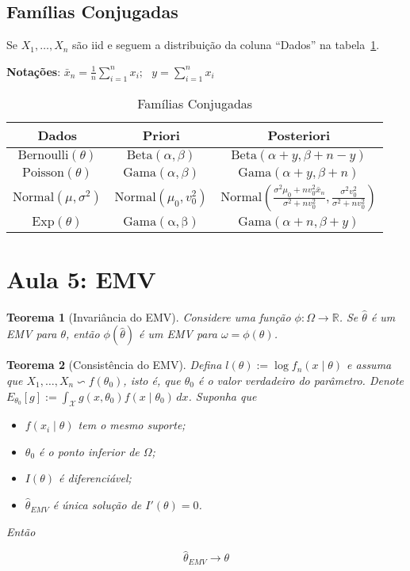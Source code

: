 \documentclass{article}
\newtheorem{theorem}{Teorema}
\begin{document}
\subsection*{Famílias Conjugadas}

Se $X_1,\ldots,X_n$ são iid e seguem a distribuição da coluna ``Dados'' na tabela~\ref{tab:1}.

\textbf{Notações}: $\bar {x}_n= \frac{1}{n}\sum_{i=1}^n x_i;~~~
y=\sum_{i=1}^nx_i$
\begin{table}[!htb]
    \centering
    \begin{tabular}{|c|c|c|}
        \hline \textbf{Dados} & \textbf{Priori} & \textbf{Posteriori}\\ \hline
         $\mathrm{Bernoulli}(\theta)$&$\mathrm{Beta}(\alpha,\beta)$ & $\mathrm{Beta}(\alpha+y,\beta+n-y)$ \\ \hline
         $\mathrm{Poisson}(\theta)$&$\mathrm{Gama}(\alpha,\beta)$&$\mathrm{Gama}(\alpha+y,\beta+n)$\\ \hline 
         $\mathrm{Normal}(\mu,\sigma^2)$ & $\mathrm{Normal}(\mu_0,v_0^2)$& $\mathrm{Normal}\left(\frac{\sigma^2\mu_0+nv_0^2\bar{x}_n}{\sigma^2+nv_0^2},\frac{\sigma^2v_0^2}{\sigma^2+nv_0^2}\right)$ \\ \hline
         $\mathrm{Exp}(\theta)$ &$\mathrm{Gama(\alpha,\beta)}$ & $\mathrm{Gama}(\alpha+n,\beta+y)$ \\ \hline

    \end{tabular}
    \caption{Famílias Conjugadas}\label{tab:1}
\end{table}

\section*{Aula 5: EMV}
\label{s5}
\begin{theorem}[Invariância do EMV]
Considere uma função $\phi: \Omega \rightarrow \mathbb{R}$. Se $\hat{\theta}$ é um EMV para $\theta$, então $\phi(\hat{\theta})$ é um EMV para $\omega = \phi(\theta)$.
\end{theorem}

\begin{theorem}[Consistência do EMV]
Defina $l(\theta) := \log f_n(x \mid \theta)$ e assuma que $X_1, \ldots, X_n \backsim f(\theta_0)$, isto é, que $\theta_0$ é o valor verdadeiro do parâmetro.
Denote $E_{\theta_0}[g] := \int_{\mathcal{X}} g(x, \theta_0) f(x \mid \theta_0)\, dx$. Suponha que

\begin{itemize}
    \item $f(x_i \mid \theta)$ tem o mesmo suporte;
    \item $\theta_0$ é o ponto inferior de $\Omega$;
    \item $I(\theta)$ é diferenciável;
    \item $\hat{\theta}_{EMV}$ é única solução de $I'(\theta) = 0$.
\end{itemize}

Então

$$\hat{\theta}_{EMV} \rightarrow \theta$$

\end{theorem}
\end{document}
